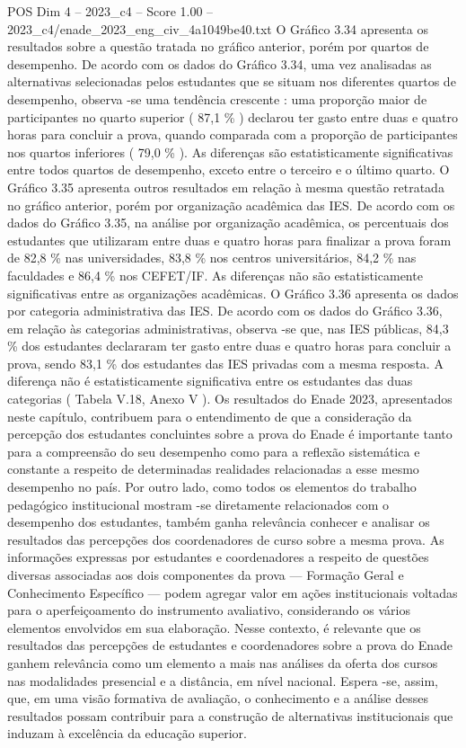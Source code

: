 \begin{textsample}{POS Dim 4 – 2023\_c4 – Score 1.00 – 2023\_c4/enade\_2023\_eng\_civ\_4a1049be40.txt}
O Gráfico 3.34 apresenta os resultados sobre a questão tratada no gráfico anterior, porém por quartos de desempenho.
De acordo com os dados do Gráfico 3.34, uma vez analisadas as alternativas selecionadas pelos estudantes que se situam nos diferentes quartos de desempenho, observa -se uma tendência crescente : uma proporção maior de participantes no quarto superior ( 87,1 \% ) declarou ter gasto entre duas e quatro horas para concluir a prova, quando comparada com a proporção de participantes nos quartos inferiores ( 79,0 \% ).
As diferenças são estatisticamente significativas entre todos quartos de desempenho, exceto entre o terceiro e o último quarto.
O Gráfico 3.35 apresenta outros resultados em relação à mesma questão retratada no gráfico anterior, porém por organização acadêmica das IES.
De acordo com os dados do Gráfico 3.35, na análise por organização acadêmica, os percentuais dos estudantes que utilizaram entre duas e quatro horas para finalizar a prova foram de 82,8 \% nas universidades, 83,8 \% nos centros universitários, 84,2 \% nas faculdades e 86,4 \% nos CEFET/IF.
As diferenças não são estatisticamente significativas entre as organizações acadêmicas.
O Gráfico 3.36 apresenta os dados por categoria administrativa das IES.
De acordo com os dados do Gráfico 3.36, em relação às categorias administrativas, observa -se que, nas IES públicas, 84,3 \% dos estudantes declararam ter gasto entre duas e quatro horas para concluir a prova, sendo 83,1 \% dos estudantes das IES privadas com a mesma resposta.
A diferença não é estatisticamente significativa entre os estudantes das duas categorias ( Tabela V.18, Anexo V ).
Os resultados do Enade 2023, apresentados neste capítulo, contribuem para o entendimento de que a consideração da percepção dos estudantes concluintes sobre a prova do Enade é importante tanto para a compreensão do seu desempenho como para a reflexão sistemática e constante a respeito de determinadas realidades relacionadas a esse mesmo desempenho no país.
Por outro lado, como todos os elementos do trabalho pedagógico institucional mostram -se diretamente relacionados com o desempenho dos estudantes, também ganha relevância conhecer e analisar os resultados das percepções dos coordenadores de curso sobre a mesma prova.
As informações expressas por estudantes e coordenadores a respeito de questões diversas associadas aos dois componentes da prova — Formação Geral e Conhecimento Específico — podem agregar valor em ações institucionais voltadas para o aperfeiçoamento do instrumento avaliativo, considerando os vários elementos envolvidos em sua elaboração.
Nesse contexto, é relevante que os resultados das percepções de estudantes e coordenadores sobre a prova do Enade ganhem relevância como um elemento a mais nas análises da oferta dos cursos nas modalidades presencial e a distância, em nível nacional.
Espera -se, assim, que, em uma visão formativa de avaliação, o conhecimento e a análise desses resultados possam contribuir para a construção de alternativas institucionais que induzam à excelência da educação superior.

\end{textsample}

